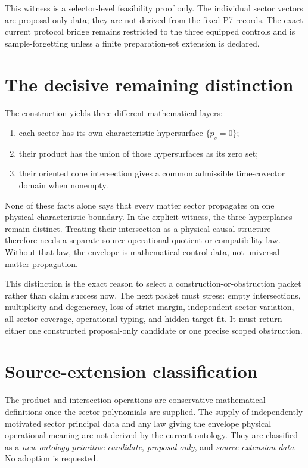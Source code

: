 \documentclass[11pt]{article}
\begin{document}
This witness is a selector-level feasibility proof only.  The individual
sector vectors are proposal-only data; they are not derived from the fixed P7
records.  The exact current protocol bridge remains restricted to the three
equipped controls and is sample-forgetting unless a finite preparation-set
extension is declared.

\section{The decisive remaining distinction}

The construction yields three different mathematical layers:
\begin{enumerate}[leftmargin=*]
  \item each sector has its own characteristic hypersurface
        \(\{p_s=0\}\);
  \item their product has the union of those hypersurfaces as its zero set;
  \item their oriented cone intersection gives a common admissible
        time-covector domain when nonempty.
\end{enumerate}
None of these facts alone says that every matter sector propagates on one
physical characteristic boundary.  In the explicit witness, the three
hyperplanes remain distinct.  Treating their intersection as a physical
causal structure therefore needs a separate source-operational quotient or
compatibility law.  Without that law, the envelope is mathematical control
data, not universal matter propagation.

This distinction is the exact reason to select a construction-or-obstruction
packet rather than claim success now.  The next packet must stress:
empty intersections, multiplicity and degeneracy, loss of strict margin,
independent sector variation, all-sector coverage, operational typing, and
hidden target fit.  It must return either one constructed proposal-only
candidate or one precise scoped obstruction.

\section{Source-extension classification}

The product and intersection operations are conservative mathematical
definitions once the sector polynomials are supplied.  The supply of
independently motivated sector principal data and any law giving the envelope
physical operational meaning are not derived by the current ontology.  They
are classified as a \emph{new ontology primitive candidate},
\emph{proposal-only}, and \emph{source-extension data}.  No adoption is
requested.
\end{document}
